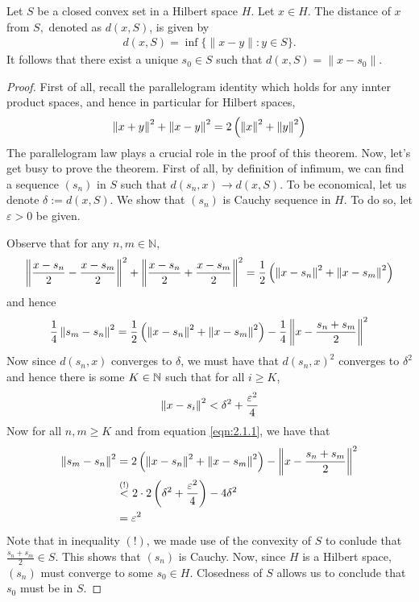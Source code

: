 \begin{theorem}
Let $S$ be a closed convex set in a Hilbert space $H.$ Let $x\in H.$ The distance of $x$ from $S,$ denoted as $d(x,S)$, is given by
\begin{align*}
d(x,S)= \inf\{ \|x-y\|: y\in S\}.
\end{align*} 
It follows that there exist a unique $s_0\in S$ such that $d(x,S)= \|x-s_0\|.$
    \label{thm:closed-and-convex}
\end{theorem}
\begin{proof}
    First of all, recall the parallelogram identity which holds for any innter product spaces, and hence in particular for Hilbert spaces,
    \begin{equation*}
	\left\lVert x+y \right\rVert^{2} + \left\lVert x-y \right\rVert^{2} = 2 \left( \left\lVert x \right\rVert^{2} + \left\lVert y \right\rVert^{2} \right)
    \end{equation*}
    The parallelogram law plays a crucial role in the proof of this theorem.
    Now, let's get busy to prove the theorem.
    First of all, by definition of infimum, we can find a sequence $\left( s_{n} \right)$ in $S$ such that $d (s_{n}, x) \to d \left( x,S \right)$. To be economical, let us denote $\delta := d \left( x,S \right)$. We show that $\left( s_n \right)$ is Cauchy sequence in $H$. To do so, let $\varepsilon >0$ be given.

    Observe that for any $n,m \in \mathbb N$,
    \begin{align*}
	\left\lVert \frac{x-s_{n}}{2} - \frac{x-s_m}{2} \right\rVert^{2} + \left\lVert \frac{x-s_{n}}{2} + \frac{x-s_m}{2} \right\rVert^{2} = \frac{1}{2} \left( \left\lVert x-s_{n} \right\rVert^{2} + \left\lVert x-s_m \right\rVert^{2} \right)
    \end{align*}
     and hence
     \begin{align}
	 \frac{1}{4} \left\lVert s_m - s_n \right\rVert^{2} = \frac{1}{2} \left( \left\lVert x-s_{n} \right\rVert^{2} + \left\lVert x-s_m \right\rVert^{2} \right) - \frac{1}{4} \left\lVert x - \frac{s_n + s_m}{2} \right\rVert^{2}
	 \label{eqn:2.1.1}
     \end{align}
     Now since $d\left( s_n ,x \right)$ converges to $\delta$, we must have that $d \left( s_{n} , x \right)^{2}$ converges to $\delta ^{2}$ and hence there is some $K\in \mathbb N$ such that for all $i\ge K$, 
     \begin{equation*}
	 \left\lVert x-s_{i} \right\rVert^{2} < \delta^{2} + \frac{\varepsilon ^2}{4} 
     \end{equation*}
     Now for all $n,m \ge K$ and from equation \ref{eqn:2.1.1}, we have that 
\begin{align*}
    \left\lVert s_m - s_n \right\rVert^{2} &= 2 \left( \left\lVert x-s_{n} \right\rVert^{2} + \left\lVert x-s_m \right\rVert^{2} \right) - \left\lVert x - \frac{s_n + s_m}{2} \right\rVert^{2} \\
	 &\stackrel{(!)}{<} 2 \cdot 2\left( \delta ^{2} + \frac{\varepsilon ^2}{4} \right)-  4 \delta ^{2} \\
	 &= \varepsilon^2
     \end{align*}
     Note that in inequality $(!)$, we made use of the convexity of $S$ to conlude that $\frac{s_n + s_m}{2} \in S$. 
     This shows that $\left( s_{n} \right)$ is Cauchy. Now, since $H$ is a Hilbert space, $\left( s_{n} \right)$ must converge to some $s_{0} \in H$. Closedness of $S$ allows us to conclude that $s_0$ must be in $S.$


\end{proof}

